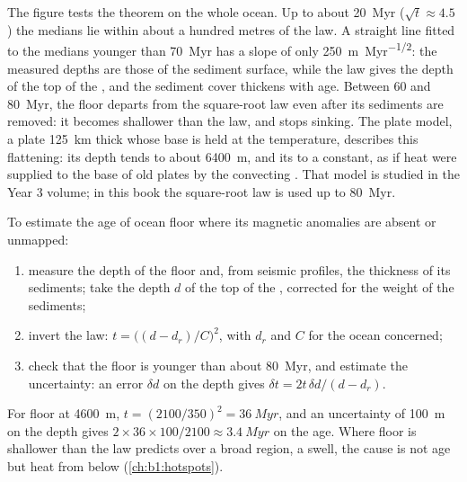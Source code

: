 The figure tests the theorem on the whole ocean. Up to about
\qty{20}{Myr} ($\sqrt t \approx 4.5$) the medians lie within about a hundred
metres of the law. A straight line fitted to the medians younger
than \qty{70}{Myr} has a slope of only \qty{250}{m.Myr^{-1/2}}: the measured
depths are those of the sediment surface, while the law gives the depth of the
top of the , and the sediment cover thickens with age. Between 60 and
\qty{80}{Myr}, the floor departs from the square-root law even after its
sediments are removed: it becomes shallower than the law, and stops sinking.
The plate model, a plate \qty{125}{km} thick whose base is held at the 
temperature, describes this flattening: its depth tends to about
\qty{6400}{m}, and its  to a constant, as if heat were supplied to the
base of old plates by the convecting . That model is studied in the
Year 3 volume; in this book the square-root law is used up to \qty{80}{Myr}.

\begin{method}\label{met:b1:rifts-ridges-margins:age-from-depth}
To estimate the age of ocean floor where its magnetic anomalies are absent or
unmapped:
\begin{enumerate}
  \item measure the depth of the floor and, from seismic profiles, the
        thickness of its sediments; take the depth $d$ of the top of the ,
        corrected for the weight of the sediments;
  \item invert the law: $t = \bigl((d - d_r)/C\bigr)^2$, with $d_r$ and $C$ for
        the ocean concerned;
  \item check that the floor is younger than about \qty{80}{Myr}, and estimate
        the uncertainty: an error $\delta d$ on the depth gives
        $\delta t = 2t\,\delta d/(d - d_r)$.
\end{enumerate}
\end{method}

For floor at \qty{4600}{m}, $t = (2100/350)^2 = \qty{36}{Myr}$, and an
uncertainty of \qty{100}{m} on the depth gives $2\times36\times100/2100 \approx
\qty{3.4}{Myr}$ on the age. Where floor is shallower than the law predicts over
a broad region, a swell, the cause is not age but heat from below
(\cref{ch:b1:hotspots}).


